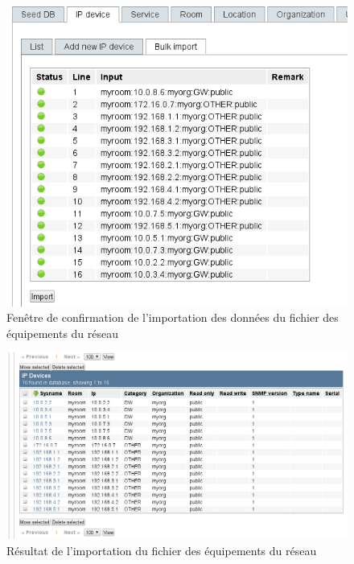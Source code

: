 \begin{figure}[H]
    \begin{center}
     \includegraphics[scale=0.7]{images/seeddb_import.png}
     \caption{Fenêtre de confirmation de l'importation des données du fichier des équipements du réseau} \label {fig:seeddb_import_1} 
        \end{center}
   \end{figure}

\begin{figure}[H]
    \begin{center}
     \includegraphics[scale=0.5]{images/seeddb_import_suite.png}
     \caption{Résultat de l'importation du fichier des équipements du réseau} \label {fig:seeddb_import_2} 
        \end{center}
   \end{figure}